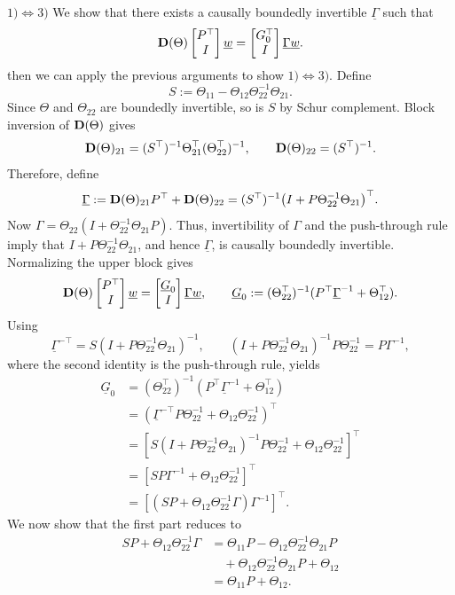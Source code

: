 $1)\iff3)$ We show that there exists a causally boundedly invertible
$\underline\Gamma$ such that
\[
    \mathbf{D}(\Theta)\begin{bmatrix}P^\top\\I\end{bmatrix}\underline w
    =\begin{bmatrix}G_0^\top\\I\end{bmatrix}\underline\Gamma\underline w.
\]
then we can apply the previous arguments to show $1)\iff 3)$. Define
\[
    S:=\Theta_{11}-\Theta_{12}\Theta_{22}^{-1}\Theta_{21}.
\]
Since $\Theta$ and $\Theta_{22}$ are boundedly invertible, so is $S$ by Schur complement.
Block inversion of $\mathbf{D}(\Theta)$ gives
\[
    \mathbf{D}(\Theta)_{21}
    =(S^\top)^{-1}\Theta_{21}^\top(\Theta_{22}^\top)^{-1},
    \qquad
    \mathbf{D}(\Theta)_{22}=(S^\top)^{-1}.
\]
Therefore, define
\[
    \underline\Gamma
    :=\mathbf{D}(\Theta)_{21}P^\top+\mathbf{D}(\Theta)_{22}
    =(S^\top)^{-1}
      \bigl(I+P\Theta_{22}^{-1}\Theta_{21}\bigr)^\top.
\]
Now $\Gamma=\Theta_{22}(I+\Theta_{22}^{-1}\Theta_{21}P)$.
Thus, invertibility of $\Gamma$ and the push-through rule imply that
$I+P\Theta_{22}^{-1}\Theta_{21}$, and hence $\underline\Gamma$, is
causally boundedly invertible. Normalizing the upper block gives
\[
    \mathbf{D}(\Theta)\begin{bmatrix}P^\top\\I\end{bmatrix}\underline w
    =\begin{bmatrix}\underline G_0\\I\end{bmatrix}\underline\Gamma\underline w,
    \qquad
    \underline G_0:=(\Theta_{22}^\top)^{-1}
    (P^\top\underline\Gamma^{-1}+\Theta_{12}^\top).
\]
Using
\[
    \underline\Gamma^{-\top}
    =S(I+P\Theta_{22}^{-1}\Theta_{21})^{-1},
    \qquad
    (I+P\Theta_{22}^{-1}\Theta_{21})^{-1}P\Theta_{22}^{-1}
    =P\Gamma^{-1},
\]
where the second identity is the push-through rule, yields
\begin{align*}
    \underline G_0
    &=(\Theta_{22}^\top)^{-1}
      (P^\top\underline\Gamma^{-1}+\Theta_{12}^\top) \\
    &=\left(
        \underline\Gamma^{-\top}P\Theta_{22}^{-1}
        +\Theta_{12}\Theta_{22}^{-1}
      \right)^\top \\
    &=\left[
        S(I+P\Theta_{22}^{-1}\Theta_{21})^{-1}
        P\Theta_{22}^{-1}
        +\Theta_{12}\Theta_{22}^{-1}
      \right]^\top \\
    &=\left[
        SP\Gamma^{-1}+\Theta_{12}\Theta_{22}^{-1}
      \right]^\top \\
    &=\left[
        \left(SP+\Theta_{12}\Theta_{22}^{-1}\Gamma\right)
        \Gamma^{-1}
      \right]^\top.
\end{align*}
We now show that the first part reduces to
\begin{align*}
    SP+\Theta_{12}\Theta_{22}^{-1}\Gamma
    &=\Theta_{11}P
      -\Theta_{12}\Theta_{22}^{-1}\Theta_{21}P \\
    &\quad+\Theta_{12}\Theta_{22}^{-1}\Theta_{21}P
      +\Theta_{12} \\
    &=\Theta_{11}P+\Theta_{12}.
\end{align*}

